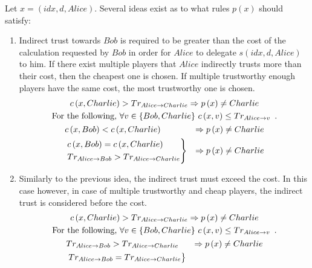   Let $x = \left(idx, d, Alice\right)$. Several ideas exist as to what rules $p\left(x\right)$ should satisfy:
  \begin{enumerate}
    \item Indirect trust towards $Bob$ is required to be greater than the cost of the calculation requested by $Bob$ in order
    for $Alice$ to delegate $s\left(idx, d, Alice\right)$ to him. If there exist multiple players that $Alice$ indirectly
    trusts more than their cost, then the cheapest one is chosen. If multiple trustworthy enough players have the same cost,
    the most trustworthy one is chosen.
    \begin{gather*}
        c\left(x, Charlie\right) > Tr_{Alice \rightarrow Charlie} \Rightarrow p\left(x\right) \neq Charlie \\
	\mbox{For the following, } \forall v \in \{Bob, Charlie\} \ c\left(x, v\right) \leq Tr_{Alice \rightarrow v} \enspace.
	\\
      \begin{aligned}
        & c\left(x, Bob\right) < c\left(x, Charlie\right) & \Rightarrow p\left(x\right) \neq Charlie  \\
        &
        \begin{rcases}
          c\left(x, Bob\right) = c\left(x, Charlie\right) \\
  	Tr_{Alice \rightarrow Bob} > Tr_{Alice \rightarrow Charlie}
        \end{rcases}
        & \Rightarrow p\left(x\right) \neq Charlie
      \end{aligned}
    \end{gather*}
    \item Similarly to the previous idea, the indirect trust must exceed the cost. In this case however, in case of multiple
    trustworthy and cheap players, the indirect trust is considered before the cost.
    \begin{gather*}
        c\left(x, Charlie\right) > Tr_{Alice \rightarrow Charlie} \Rightarrow p\left(x\right) \neq Charlie \\
	\mbox{For the following, } \forall v \in \{Bob, Charlie\} \ c\left(x, v\right) \leq Tr_{Alice \rightarrow v} \enspace.
	\\
      \begin{aligned}
        & Tr_{Alice \rightarrow Bob} > Tr_{Alice \rightarrow Charlie} & \Rightarrow p\left(x\right) \neq Charlie \\
        &
        \begin{rcases}
          Tr_{Alice \rightarrow Bob} = Tr_{Alice \rightarrow Charlie} \\

\end{rcases}
\end{aligned}
\end{gather*}
\end{enumerate}
